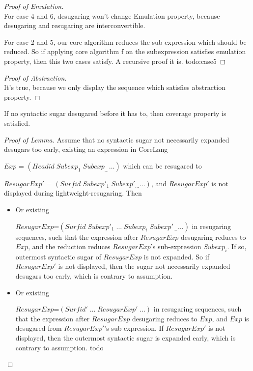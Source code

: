 \begin{proof}[Proof of Emulation]
\hfill\\
For case 4 and 6, desugaring won't change Emulation property, because desugaring and resugaring are interconvertible.

For case 2 and 5, our core algorithm reduces the sub-expression which should be reduced. So if applying core algorithm f on the subexpression satisfies emulation property, then this two cases satisfy. A recursive proof it is.
todo:case5
\end{proof}

\begin{proof}[Proof of Abstraction]
\hfill\\
It's true, because we only display the sequence which satisfies abstraction property.
\end{proof}

\begin{lemma}
If no syntactic sugar desugared before it has to, then coverage property is satisfied.
\end{lemma}

\begin{proof}[Proof of Lemma]
Assume that no syntactic sugar not necessarily expanded desugars too early, existing an expression in CoreLang

$Exp$ = $(Headid\;Subexp_{1}\;Subexp_{\ldots} \ldots)$ which can be resugared to

$ResugarExp'$ = $(Surfid\;Subexp'_{1}\;Subexp'_{\ldots}\ldots)$, and $ResugarExp'$ is not displayed during lightweight-resugaring. Then

\begin{itemize}
	\item Or existing

	$ResugarExp$=$(Surfid\;Subexp'_{1}\;\ldots\;Subexp_{i}\;Subexp'_{\ldots}\ldots)$ in resugaring sequences, such that the expression after $ResugarExp$ desugaring reduces to $Exp$, and the reduction reduces $ResugarExp$'s sub-expression $Subexp_{i}$. If so, outermost syntactic sugar of $ResugarExp$ is not expanded. So if $ResugarExp'$ is not displayed, then the sugar not necessarily expanded desugars too early, which is contrary to assumption.


	\item Or existing

	$ResugarExp$=$(Surfid'\;\ldots\;ResugarExp'\;\ldots)$ in resugaring sequences, such that the expression after $ResugarExp$ desugaring reduces to $Exp$, and $Exp$ is desugared from $ResugarExp'$'s sub-expression. If $ResugarExp'$ is not displayed, then the outermost syntactic sugar is expanded early, which is contrary to assumption.
	todo

\end{itemize}
\end{proof}

